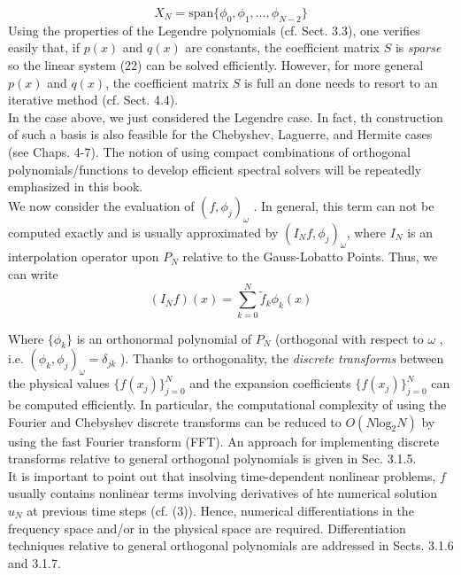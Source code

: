 \begin{equation}
	X_{ N } = \mathrm{ span } \{ \phi_{ 0 }, \phi_{ 1 }, \ldots, \phi_{ N-2 } \}
\end{equation}
\indent Using the properties of the Legendre polynomials (cf. Sect. 3.3), one verifies easily that, if $ p(x) $ and $ q(x) $  are constants, the coefficient matrix $ S $ is \textit{sparse} so the linear system (22) can be solved efficiently. However, for more general $ p(x) $ and $ q(x) $, the coefficient matrix $ S $ is full an done needs to resort to an iterative method (cf. Sect. 4.4). \\
\indent In the case above, we just considered the Legendre case. In fact, th construction of such a basis is also feasible for the Chebyshev, Laguerre, and Hermite cases (see Chaps. 4-7). The notion of using compact combinations of orthogonal polynomials/functions to develop efficient spectral solvers will be repeatedly emphasized in this book. \\
\indent We now consider the evaluation of $ \left( f, \phi_{ j } \right)_{ \omega } $ . In general, this term can not be computed exactly and is usually approximated by $ \left( I_{ N }f, \phi_{ j } \right)_{ \omega } $, where $ I_{ N } $ is an interpolation operator upon $ P_{ N } $ relative to the Gauss-Lobatto Points. Thus, we can write
\begin{equation}
	\left( I_{ N } f \right) (x) = \sum_{ k=0 }^{ N } \tilde{ f }_{ k } \phi_{ k } (x)
\end{equation}

Where $ \{ \phi_{ k } \} $ is an orthonormal polynomial of $ P_{ N } $ (orthogonal with respect to $ \omega $ , i.e. $ \left( \phi_{ k }, \phi_{ j } \right)_{ \omega } = \delta_{ jk } $ ). Thanks to orthogonality, the \textit{discrete transforms} between the physical values $ \{ f(x_{ j }) \}_{ j=0 }^{ N } $ and the expansion coefficients $ \{ f(x_{ j }) \}_{ j=0 }^{ N } $ can be computed efficiently. In particular, the computational complexity of using the Fourier and Chebyshev discrete transforms can be reduced to $ O(N \mathrm{ log }_{ 2 } N) $ by using the fast Fourier transform (FFT). An approach for implementing discrete transforms relative to general orthogonal polynomials is given in Sec. 3.1.5. \\
\indent It is important to point out that insolving time-dependent nonlinear problems, $ f $ usually contains nonlinear terms involving derivatives of hte numerical solution $ u_{ N } $ at previous time steps (cf. (3)). Hence, numerical differentiations in the frequency space and/or in the physical space are required. Differentiation techniques relative to general orthogonal polynomials are addressed in Sects. 3.1.6 and  3.1.7.\\

